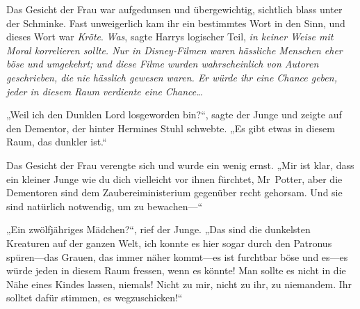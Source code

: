 Das Gesicht der Frau war aufgedunsen und übergewichtig, sichtlich blass unter der Schminke. Fast unweigerlich kam ihr ein bestimmtes Wort in den Sinn, und dieses Wort war \emph{Kröte}.
\emph{Was}, sagte Harrys logischer Teil, \emph{in keiner Weise mit Moral korrelieren sollte. Nur in Disney-Filmen waren hässliche Menschen eher böse und umgekehrt; und diese Filme wurden wahrscheinlich von Autoren geschrieben, die nie hässlich gewesen waren. Er würde ihr eine Chance geben, jeder in diesem Raum verdiente eine Chance…}

„Weil ich den Dunklen Lord losgeworden bin?“, sagte der Junge und zeigte auf den Dementor, der hinter Hermines Stuhl schwebte. „Es gibt etwas in diesem Raum, das dunkler ist.“

Das Gesicht der Frau verengte sich und wurde ein wenig ernst.
„Mir ist klar, dass ein kleiner Junge wie du dich vielleicht vor ihnen fürchtet, Mr~Potter, aber die Dementoren sind dem Zaubereiministerium gegenüber recht gehorsam. Und sie sind natürlich notwendig, um zu bewachen—“

„Ein zwölfjähriges Mädchen?“, rief der Junge. „Das sind die dunkelsten Kreaturen auf der ganzen Welt, ich konnte es hier sogar durch den Patronus spüren—das Grauen, das immer näher kommt—es ist furchtbar böse und es—es würde jeden in diesem Raum fressen, wenn es könnte! Man sollte es nicht in die Nähe eines Kindes lassen, niemals! Nicht zu mir, nicht zu ihr, zu niemandem. Ihr solltet dafür stimmen, es wegzuschicken!“

